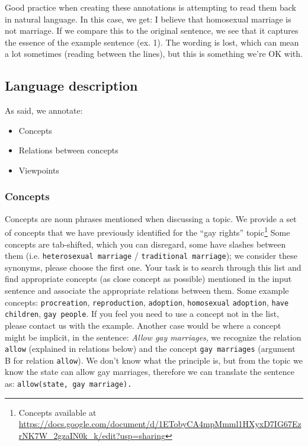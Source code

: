 Good practice when creating these annotations is attempting to read them back
in natural language. In this case, we get: I believe that homosexual marriage
is not marriage.  If we compare this to the original sentence, we see that it
captures the essence of the example sentence (ex. 1). The wording is lost,
which can mean a lot sometimes (reading between the lines), but this is
something we’re OK with.

\subsection*{Language description}

As said, we annotate:
\begin{itemize}
\item Concepts
\item Relations between concepts
\item Viewpoints
\end{itemize}

\subsubsection*{Concepts}

Concepts are noun phrases mentioned when discussing a topic. We provide a set
of concepts that we have previously identified for the ``gay rights'' topic\footnote{
Concepts available at 
\url{https://docs.google.com/document/d/1ETobyCA4mpMmml1HXyxD7IG67EzrNK7W_2gzaIN0k_k/edit?usp=sharing}
}
Some concepts are tab-shifted, which you can disregard, some have
slashes between them (i.e. \texttt{heterosexual marriage} / \texttt{traditional marriage}); we
consider these synonyms, please choose the first one. Your task is to search
through this list and find appropriate concepts (as close concept as possible)
mentioned in the input sentence and associate the appropriate relations between
them. Some example concepts: \texttt{procreation}, \texttt{reproduction}, \texttt{adoption}, \texttt{homosexual}
\texttt{adoption}, \texttt{have children}, \texttt{gay people}. 
If you feel you need to use a concept not
in the list, please contact us with the example. Another case would be where a
concept might be implicit, in the sentence: \textit{Allow gay marriages}, we recognize
the relation \texttt{allow} (explained in relations below) and the concept \texttt{gay marriages}
(argument B for relation \texttt{allow}).  We don’t know what the principle is, but from
the topic we know the state can allow gay marriages, therefore we can translate
the sentence as: \texttt{allow(state, gay marriage).}

